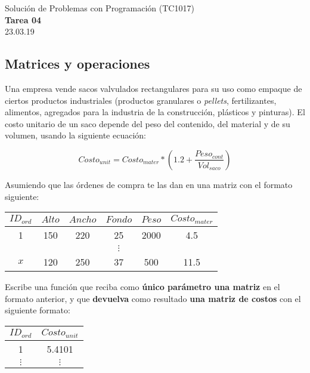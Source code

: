 \documentclass[]{book}
\theoremstyle{definition}
\begin{document}
\begin{center}
{\huge Solución de Problemas con Programación (TC1017)}\\[1.5ex]
{\large \textbf{Tarea 04}\\[1.5ex] %
23.03.19} %
\end{center}

\vspace{0.2 cm}

\subsection*{Matrices y operaciones}

Una empresa vende sacos valvulados rectangulares para su uso como empaque de ciertos productos industriales (productos granulares o \textit{pellets}, fertilizantes, alimentos, agregados para la industria de la construcción, plásticos y pinturas).
El costo unitario de un saco depende del peso del contenido, del material y de su volumen, usando la siguiente ecuación:

\bigskip

$$Costo_{unit} = Costo_{mater} * \left( 1.2 + \frac{Peso_{cont}}{Vol_{saco}} \right)$$

\bigskip

Asumiendo que las órdenes de compra te las dan en una matriz con el formato siguiente:

\begin{table}[htbp]
    \centering
    \begin{tabular}{@{}cccccc@{}}
    \toprule
    $ID_{ord}$ & $Alto$ & $Ancho$ & $Fondo$ & $Peso$ & $Costo_{mater}$ \\ \midrule
    1 & 150 & 220 & 25 & 2000 & 4.5 \\
     &  &  & $\vdots$ &  &  \\
    $x$ & 120 & 250 & 37 & 500 & 11.5 \\ \bottomrule
    \end{tabular}
\end{table}

Escribe una función que reciba como \textbf{único parámetro una matriz} en el formato anterior,
y que \textbf{devuelva} como resultado \textbf{una matriz de costos} con el siguiente formato:

\begin{table}[htbp]
    \centering
    \begin{tabular}{@{}cc@{}}
    \toprule
    $ID_{ord}$ & $Costo_{unit}$ \\ \midrule
    1 & 5.4101 \\
    $\vdots$ & $\vdots$ \\ \bottomrule
    \end{tabular}
\end{table}
\end{document}
